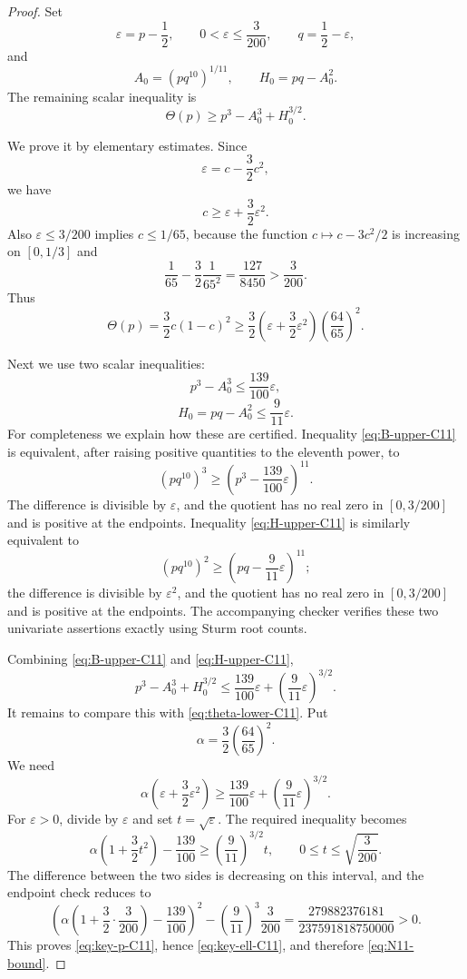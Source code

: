 \documentclass[11pt]{article}
\newcommand{\eps}{\varepsilon}
\begin{document}
\begin{proof}
Set
\[
        \eps=p-\frac12,
        \qquad 0<\eps\le\frac3{200},
        \qquad q=\frac12-\eps,
\]
and
\[
        A_0=(pq^{10})^{1/11},
        \qquad H_0=pq-A_0^2.
\]
The remaining scalar inequality is
\begin{equation}\label{eq:key-p-C11}
        \Theta(p)\ge p^3-A_0^3+H_0^{3/2}.
\end{equation}

We prove it by elementary estimates.  Since
\[
        \eps=c-\frac32c^2,
\]
we have
\[
        c\ge \eps+\frac32\eps^2.
\]
Also $\eps\le3/200$ implies $c\le1/65$, because the function $c\mapsto c-3c^2/2$ is increasing on $[0,1/3]$ and
\[
        \frac1{65}-\frac32\frac1{65^2}=\frac{127}{8450}>\frac3{200}.
\]
Thus
\begin{equation}\label{eq:theta-lower-C11}
        \Theta(p)=\frac32c(1-c)^2
        \ge \frac32\left(\eps+\frac32\eps^2\right)\left(\frac{64}{65}\right)^2.
\end{equation}

Next we use two scalar inequalities:
\begin{equation}\label{eq:B-upper-C11}
        p^3-A_0^3\le \frac{139}{100}\eps,
\end{equation}
\begin{equation}\label{eq:H-upper-C11}
        H_0=pq-A_0^2\le \frac9{11}\eps.
\end{equation}
For completeness we explain how these are certified.  Inequality \eqref{eq:B-upper-C11} is equivalent, after raising positive quantities to the eleventh power, to
\[
        (pq^{10})^3\ge \left(p^3-\frac{139}{100}\eps\right)^{11}.
\]
The difference is divisible by $\eps$, and the quotient has no real zero in $[0,3/200]$ and is positive at the endpoints.  Inequality \eqref{eq:H-upper-C11} is similarly equivalent to
\[
        (pq^{10})^2\ge \left(pq-\frac9{11}\eps\right)^{11};
\]
the difference is divisible by $\eps^2$, and the quotient has no real zero in $[0,3/200]$ and is positive at the endpoints.  The accompanying checker verifies these two univariate assertions exactly using Sturm root counts.

Combining \eqref{eq:B-upper-C11} and \eqref{eq:H-upper-C11},
\[
        p^3-A_0^3+H_0^{3/2}
        \le \frac{139}{100}\eps+\left(\frac9{11}\eps\right)^{3/2}.
\]
It remains to compare this with \eqref{eq:theta-lower-C11}.  Put
\[
        \alpha=\frac32\left(\frac{64}{65}\right)^2.
\]
We need
\[
        \alpha\left(\eps+\frac32\eps^2\right)
        \ge \frac{139}{100}\eps+\left(\frac9{11}\eps\right)^{3/2}.
\]
For $\eps>0$, divide by $\eps$ and set $t=\sqrt\eps$.  The required inequality becomes
\[
        \alpha\left(1+\frac32t^2\right)-\frac{139}{100}
        \ge \left(\frac9{11}\right)^{3/2}t,
        \qquad 0\le t\le\sqrt{\frac3{200}}.
\]
The difference between the two sides is decreasing on this interval, and the endpoint check reduces to
\[
\left(\alpha\left(1+\frac32\cdot\frac3{200}\right)-\frac{139}{100}\right)^2
        -\left(\frac9{11}\right)^3\frac3{200}
        =\frac{279882376181}{237591818750000}>0.
\]
This proves \eqref{eq:key-p-C11}, hence \eqref{eq:key-ell-C11}, and therefore \eqref{eq:N11-bound}.
\end{proof}
\end{document}
